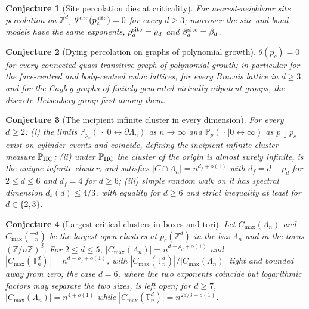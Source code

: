 \documentclass[11pt]{article}
\newtheorem{conjecture}{Conjecture}
\theoremstyle{definition}
\newcommand{\Pp}{\mathbb P}
\newcommand{\Z}{\mathbb Z}
\providecommand{\Z}{\mathbb Z}
\providecommand{\Pp}{\mathbb P}
\begin{document}
\begin{conjecture}[Site percolation dies at criticality]\label{av13}
For nearest-neighbour site percolation on $\Z^d$, $\theta^{\rm site}(p_c^{\rm site})=0$
for every $d\ge3$; moreover the site and bond models have the same
exponents, $\rho_d^{\rm site}=\rho_d$ and $\beta_d^{\rm site}=\beta_d$.
\end{conjecture}


\begin{conjecture}[Dying percolation on graphs of polynomial growth]\label{av14}
$\theta(p_c)=0$ for every connected quasi-transitive graph of
polynomial growth; in particular for the face-centred and body-centred
cubic lattices, for every Bravais lattice in $d\ge3$, and for the Cayley
graphs of finitely generated virtually nilpotent groups, the discrete
Heisenberg group first among them.
\end{conjecture}


\begin{conjecture}[The incipient infinite cluster in every dimension]\label{av15}
For every $d\ge2$: {\rm(i)} the limits
$\Pp_{p_c}(\,\cdot\mid0\leftrightarrow\partial\Lambda_n)$ as $n\to\infty$ and
$\Pp_p(\,\cdot\mid0\leftrightarrow\infty)$ as $p\downarrow p_c$ exist on
cylinder events and coincide, defining the incipient infinite cluster
measure $\Pp_{\rm IIC}$; {\rm(ii)} under $\Pp_{\rm IIC}$ the cluster of
the origin is almost surely infinite, is the unique infinite cluster,
and satisfies $|C\cap\Lambda_n|=n^{d_f+o(1)}$ with $d_f=d-\rho_d$ for
$2\le d\le6$ and $d_f=4$ for $d\ge6$; {\rm(iii)} simple
random walk on it has spectral dimension $d_s(d)\le4/3$, with equality
for $d\ge6$ and strict inequality at least for $d\in\{2,3\}$.
\end{conjecture}


\begin{conjecture}[Largest critical clusters in boxes and tori]\label{av16}
Let $C_{\max}(\Lambda_n)$ and $C_{\max}(\mathbb T_n^d)$ be the largest open
clusters at $p_c(\Z^d)$ in the box $\Lambda_n$ and in the torus
$(\Z/n\Z)^d$.  For $2\le d\le5$,
$|C_{\max}(\Lambda_n)|=n^{d-\rho_d+o(1)}$ and
$|C_{\max}(\mathbb T_n^d)|=n^{d-\rho_d+o(1)}$, with
$|C_{\max}(\mathbb T_n^d)|/|C_{\max}(\Lambda_n)|$ tight and bounded away
from zero; the case $d=6$, where the two exponents coincide but
logarithmic factors may separate the two sizes, is left open; for
$d\ge7$, $|C_{\max}(\Lambda_n)|=n^{4+o(1)}$ while
$|C_{\max}(\mathbb T_n^d)|=n^{2d/3+o(1)}$.
\end{conjecture}
\end{document}
